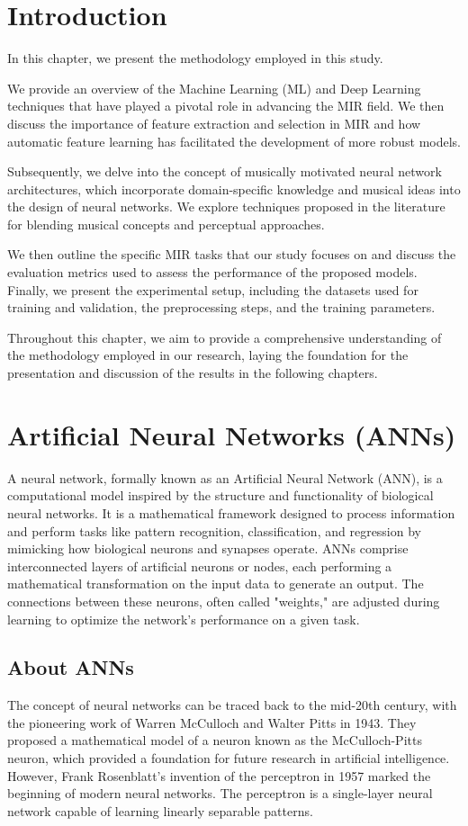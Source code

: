 \section{Introduction}

In this chapter, we present the methodology employed in this study.

We provide an overview of the Machine Learning (ML) and Deep Learning techniques that have played a pivotal role in advancing the MIR field. We then discuss the importance of feature extraction and selection in MIR and how automatic feature learning has facilitated the development of more robust models.

Subsequently, we delve into the concept of musically motivated neural network architectures, which incorporate domain-specific knowledge and musical ideas into the design of neural networks. We explore techniques proposed in the literature for blending musical concepts and perceptual approaches.

We then outline the specific MIR tasks that our study focuses on and discuss the evaluation metrics used to assess the performance of the proposed models. Finally, we present the experimental setup, including the datasets used for training and validation, the preprocessing steps, and the training parameters.

Throughout this chapter, we aim to provide a comprehensive understanding of the methodology employed in our research, laying the foundation for the presentation and discussion of the results in the following chapters.

\section{Artificial Neural Networks (ANNs)}
A neural network, formally known as an Artificial Neural Network (ANN), is a computational model inspired by the structure and functionality of biological neural networks. It is a mathematical framework designed to process information and perform tasks like pattern recognition, classification, and regression by mimicking how biological neurons and synapses operate. ANNs comprise interconnected layers of artificial neurons or nodes, each performing a mathematical transformation on the input data to generate an output. The connections between these neurons, often called "weights," are adjusted during learning to optimize the network's performance on a given task.

\subsection{About ANNs}
The concept of neural networks can be traced back to the mid-20th century, with the pioneering work of Warren McCulloch and Walter Pitts in 1943. They proposed a mathematical model of a neuron known as the McCulloch-Pitts neuron, which provided a foundation for future research in artificial intelligence. However, Frank Rosenblatt's invention of the perceptron in 1957 marked the beginning of modern neural networks. The perceptron is a single-layer neural network capable of learning linearly separable patterns.

